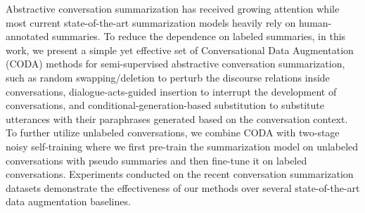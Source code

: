 Abstractive conversation summarization has received growing attention while most current state-of-the-art summarization models heavily rely on human-annotated summaries. To reduce the dependence on labeled summaries, in this work, we present a simple yet effective set of Conversational Data Augmentation (CODA) methods for semi-supervised abstractive conversation summarization, such as random swapping/deletion to perturb the discourse relations inside conversations, dialogue-acts-guided insertion to interrupt the development of conversations, and conditional-generation-based substitution to substitute utterances with their paraphrases generated based on the conversation context. To further utilize unlabeled conversations, we combine CODA with two-stage noisy self-training where we first pre-train the summarization model on unlabeled conversations with pseudo summaries and then fine-tune it on labeled conversations. Experiments conducted on the recent conversation summarization datasets demonstrate the effectiveness of our methods over several state-of-the-art data augmentation baselines.

